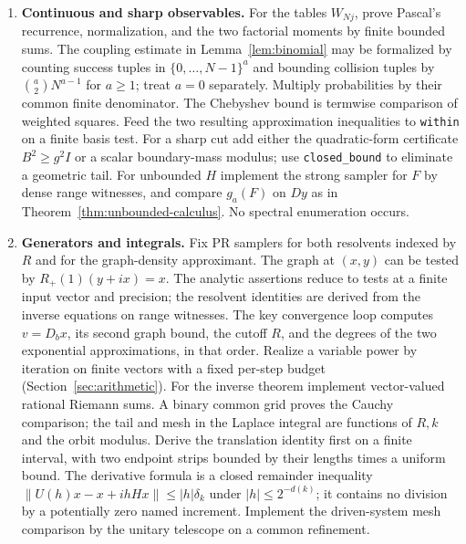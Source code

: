 \begin{enumerate}
\item \textbf{Continuous and sharp observables.} For the tables $W_{Nj}$, prove Pascal's recurrence, normalization, and the two factorial moments by finite bounded sums. The coupling estimate in Lemma~\ref{lem:binomial} may be formalized by counting success tuples in $\{0,\ldots,N-1\}^a$ and bounding collision tuples by ${a\choose2}N^{a-1}$ for $a\ge1$; treat $a=0$ separately. Multiply probabilities by their common finite denominator. The Chebyshev bound is termwise comparison of weighted squares. Feed the two resulting approximation inequalities to \texttt{within} on a finite basis test. For a sharp cut add either the quadratic-form certificate $B^2\ge g^2 I$ or a scalar boundary-mass modulus; use \texttt{closed\_bound} to eliminate a geometric tail. For unbounded $H$ implement the strong sampler for $F$ by dense range witnesses, and compare $g_a(F)$ on $Dy$ as in Theorem~\ref{thm:unbounded-calculus}. No spectral enumeration occurs.
\item \textbf{Generators and integrals.} Fix PR samplers for both resolvents indexed by $R$ and for the graph-density approximant. The graph at $(x,y)$ can be tested by $R_+(1)(y+ix)=x$. The analytic assertions reduce to tests at a finite input vector and precision; the resolvent identities are derived from the inverse equations on range witnesses. The key convergence loop computes $v=D_bx$, its second graph bound, the cutoff $R$, and the degrees of the two exponential approximations, in that order. Realize a variable power by iteration on finite vectors with a fixed per-step budget (Section~\ref{sec:arithmetic}). For the inverse theorem implement vector-valued rational Riemann sums. A binary common grid proves the Cauchy comparison; the tail and mesh in the Laplace integral are functions of $R,k$ and the orbit modulus. Derive the translation identity first on a finite interval, with two endpoint strips bounded by their lengths times a uniform bound. The derivative formula is a closed remainder inequality $\|U(h)x-x+ihHx\|\le|h|\delta_k$ under $|h|\le2^{-d(k)}$; it contains no division by a potentially zero named increment. Implement the driven-system mesh comparison by the unitary telescope on a common refinement.

\end{enumerate}
